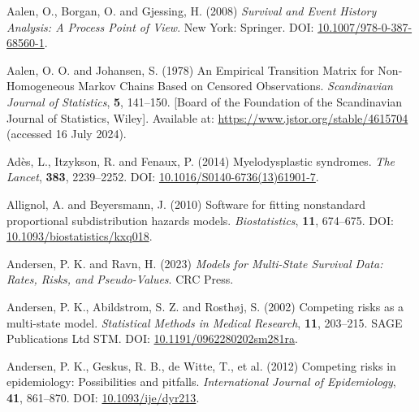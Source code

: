 \documentclass[
  letterpaper,
  DIV=11,
  numbers=noendperiod]{scrreprt}
\newlength{\cslhangindent}
\newlength{\cslentryspacingunit} %
\newenvironment{CSLReferences}[2] %
 {%
  \setlength{\parindent}{0pt}
  \ifodd #1
  \let\oldpar\par
  \def\par{\hangindent=\cslhangindent\oldpar}
  \fi
  \setlength{\parskip}{#2\cslentryspacingunit}
 }%
 {}
\begin{document}
\hypertarget{refs}{}
\begin{CSLReferences}{1}{0}
\leavevmode{}%
Aalen, O., Borgan, O. and Gjessing, H. (2008) \emph{Survival and Event
History Analysis: A Process Point of View}. New York: Springer. DOI:
\href{https://doi.org/10.1007/978-0-387-68560-1}{10.1007/978-0-387-68560-1}.

\leavevmode{}%
Aalen, O. O. and Johansen, S. (1978) An {Empirical Transition Matrix}
for {Non-Homogeneous Markov Chains Based} on {Censored Observations}.
\emph{Scandinavian Journal of Statistics}, \textbf{5}, 141--150.
{[}Board of the Foundation of the Scandinavian Journal of Statistics,
Wiley{]}. Available at: \url{https://www.jstor.org/stable/4615704}
(accessed 16 July 2024).

\leavevmode{}%
Adès, L., Itzykson, R. and Fenaux, P. (2014) Myelodysplastic syndromes.
\emph{The Lancet}, \textbf{383}, 2239--2252. DOI:
\href{https://doi.org/10.1016/S0140-6736(13)61901-7}{10.1016/S0140-6736(13)61901-7}.

\leavevmode{}%
Allignol, A. and Beyersmann, J. (2010) Software for fitting nonstandard
proportional subdistribution hazards models. \emph{Biostatistics},
\textbf{11}, 674--675. DOI:
\href{https://doi.org/10.1093/biostatistics/kxq018}{10.1093/biostatistics/kxq018}.

\leavevmode{}%
Andersen, P. K. and Ravn, H. (2023) \emph{Models for {Multi-State
Survival Data}: {Rates}, {Risks}, and {Pseudo-Values}}. CRC Press.

\leavevmode{}%
Andersen, P. K., Abildstrom, S. Z. and Rosthøj, S. (2002) Competing
risks as a multi-state model. \emph{Statistical Methods in Medical
Research}, \textbf{11}, 203--215. SAGE Publications Ltd STM. DOI:
\href{https://doi.org/10.1191/0962280202sm281ra}{10.1191/0962280202sm281ra}.

\leavevmode{}%
Andersen, P. K., Geskus, R. B., de Witte, T., et al. (2012) Competing
risks in epidemiology: Possibilities and pitfalls. \emph{International
Journal of Epidemiology}, \textbf{41}, 861--870. DOI:
\href{https://doi.org/10.1093/ije/dyr213}{10.1093/ije/dyr213}.


\end{CSLReferences}
\end{document}
